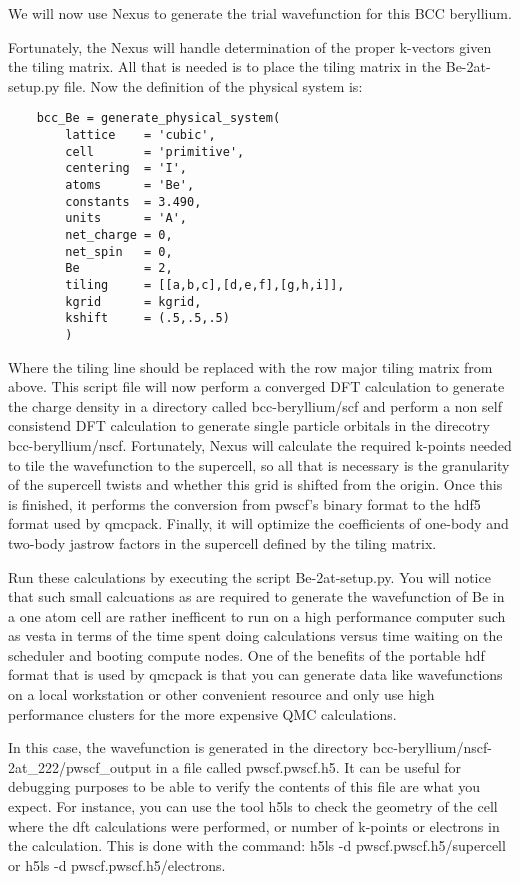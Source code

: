 We will now use Nexus to generate the trial wavefunction for this BCC beryllium.

Fortunately, the Nexus will handle determination of the proper k-vectors given the tiling matrix.  All that is needed is to place the tiling matrix in the Be-2at-setup.py file.   Now the definition of the physical system is:

\begin{shaded}
\begin{verbatim}
    bcc_Be = generate_physical_system(
        lattice    = 'cubic',
        cell       = 'primitive',
        centering  = 'I',
        atoms      = 'Be',
        constants  = 3.490,
        units      = 'A',
        net_charge = 0,
        net_spin   = 0,
        Be         = 2,
        tiling     = [[a,b,c],[d,e,f],[g,h,i]],
        kgrid      = kgrid,
        kshift     = (.5,.5,.5)
        )
\end{verbatim}
\end{shaded}
Where the tiling line should be replaced with the row major tiling matrix from above.  This script file will now perform a converged DFT calculation to generate the charge density in a directory called bcc-beryllium/scf and perform a non self consistend DFT calculation to generate single particle orbitals in the direcotry bcc-beryllium/nscf.  Fortunately, Nexus will calculate the required k-points needed to tile the wavefunction to the supercell, so all that is necessary is the granularity of the supercell twists and whether this grid is shifted from the origin.  Once this is finished, it performs the conversion from pwscf's binary format to the hdf5 format used by qmcpack.  Finally, it will optimize the coefficients of one-body and two-body jastrow factors in the supercell defined by the tiling matrix.

Run these calculations by executing the script Be-2at-setup.py.  You will notice that such small calcuations as are required to generate the wavefunction of Be in a one atom cell are rather inefficent to run on a high performance computer such as vesta in terms of the time spent doing calculations versus time waiting on the scheduler and booting compute nodes.  One of the benefits of the portable hdf format that is used by qmcpack is that you can generate data like wavefunctions on a local workstation or other convenient resource and only use high performance clusters for the more expensive QMC calculations.

In this case, the wavefunction is generated in the directory bcc-beryllium/nscf-2at\_222/pwscf\_output in a file called pwscf.pwscf.h5.  It can be useful for debugging purposes to be able to verify the contents of this file are what you expect.  For instance, you can use the tool h5ls to check the geometry of the cell where the dft calculations were performed, or number of k-points or electrons in the calculation.  This is done with the command: h5ls -d pwscf.pwscf.h5/supercell or h5ls -d pwscf.pwscf.h5/electrons.

